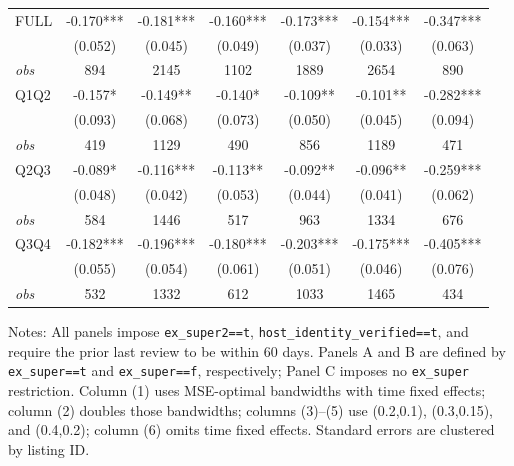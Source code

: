 \begin{table}[!htbp]
\begin{tabular}{lcccccc}
FULL & -0.170*** & -0.181*** & -0.160*** & -0.173*** & -0.154*** & -0.347*** \\
 & (0.052) & (0.045) & (0.049) & (0.037) & (0.033) & (0.063) \\
\textit{obs} & 894 & 2145 & 1102 & 1889 & 2654 & 890 \\
Q1Q2 & -0.157* & -0.149** & -0.140* & -0.109** & -0.101** & -0.282*** \\
 & (0.093) & (0.068) & (0.073) & (0.050) & (0.045) & (0.094) \\
\textit{obs} & 419 & 1129 & 490 & 856 & 1189 & 471 \\
Q2Q3 & -0.089* & -0.116*** & -0.113** & -0.092** & -0.096** & -0.259*** \\
 & (0.048) & (0.042) & (0.053) & (0.044) & (0.041) & (0.062) \\
\textit{obs} & 584 & 1446 & 517 & 963 & 1334 & 676 \\
Q3Q4 & -0.182*** & -0.196*** & -0.180*** & -0.203*** & -0.175*** & -0.405*** \\
 & (0.055) & (0.054) & (0.061) & (0.051) & (0.046) & (0.076) \\
\textit{obs} & 532 & 1332 & 612 & 1033 & 1465 & 434 \\
\bottomrule
\end{tabular}
\begin{minipage}{0.98\textwidth}\footnotesize
Notes: All panels impose \texttt{ex\_super2==t}, \texttt{host\_identity\_verified==t}, and require the prior last review to be within 60 days. Panels A and B are defined by \texttt{ex\_super==t} and \texttt{ex\_super==f}, respectively; Panel C imposes no \texttt{ex\_super} restriction. Column (1) uses MSE-optimal bandwidths with time fixed effects; column (2) doubles those bandwidths; columns (3)--(5) use (0.2,0.1), (0.3,0.15), and (0.4,0.2); column (6) omits time fixed effects. Standard errors are clustered by listing ID.
\end{minipage}
\end{table}
